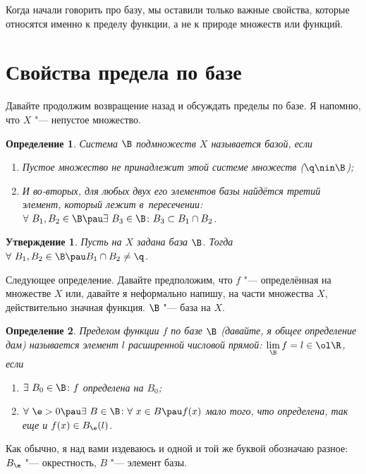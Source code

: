 \documentclass[a4paper,10pt,twoside]{article}
\newtheorem{Def}{Определение}[section]
\newtheorem{Ut}{Утверждение}[section]
\let\AVsection\section{}
\renewcommand\section{\newpage\scol\AVsection}
\newcommand{\scol}{  \renewcommand{\headrulewidth}{0.5pt}\fancyhead[RE,LO]{\thesection{} \leftmark} \fancyhead[LE,RO]{\thepage}}
\begin{document}
 Когда начали говорить про базу, мы оставили только важные свойства, которые относятся именно к пределу функции, а не к природе множеств или функций.
 
 \section{Свойства предела по базе}
 
 Давайте продолжим возвращение назад и обсуждать пределы по базе. Я напомню, что $X$ "--- непустое множество.
 
 \begin{Def}
 	Система $\B$ подмножеств $X$ называется базой, если
 	\begin{enumerate}
 	  \item Пустое множество не принадлежит этой системе множеств ($\q\nin \B$);
 	  \item И во-вторых, для любых двух его элементов базы найдётся третий элемент, который лежит в~пересечении: $\forall\  B_1,B_2\in \B
 	  \pau \exists\  B_3\in\B\colon B_3\subset B_1\cap B_2$.
 	\end{enumerate}
 \end{Def}
 
 \begin{Ut}\label{markov}
 	Пусть на $X$ задана база $\B$. Тогда $\forall\  B_1, B_2 \in \B \pau B_1\cap B_2 \neq \q$.
 \end{Ut}
 
 Следующее определение. Давайте предположим, что $f$ "--- определённая на множестве $X$ или, давайте я неформально напишу, на части множества $X$, действительно 
 значная функция. $\B$ "--- база на $X$. 
 
 \begin{Def}\label{prb}
 	Пределом функции $f$ по базе $\B$ (давайте, я общее определение дам) называется элемент $l$ расширенной числовой прямой:
 	$\lim\limits_{\B} f=l \in\ol\R$, если 
 	
 \begin{enumerate}
   \item $\exists\  B_0 \in\B\colon f$ определена на $B_0$;
   \item $\forall\  \e>0 \pau\exists\  B \in \B\colon \forall\  x \in B \pau f(x)$ мало того, что определена, так еще и $f(x) \in B_{\e} (l)$.
 \end{enumerate}
 \end{Def}
 
 Как обычно, я над вами издеваюсь и одной и той же буквой обозначаю разное: $B_{\e}$ "--- окрестность, $B$ "--- элемент базы.
 
\end{document}
